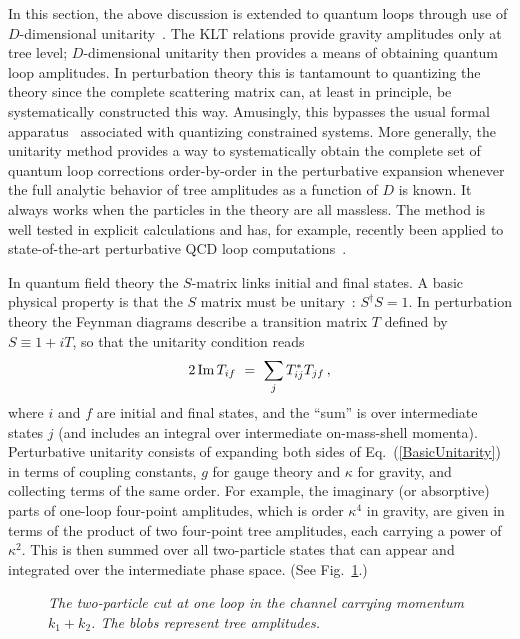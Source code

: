 \documentclass[12pt]{livrev}
\begin{document}
In this section, the above discussion is extended to quantum loops
through use of $D$-dimensional
unitarity~\cite{Bern94SusyFour,Bern95SusyFour,BernMorgan,Review,Rozowsky}.
The KLT relations provide gravity amplitudes only at tree level;
$D$-dimensional unitarity then provides a means of obtaining quantum
loop amplitudes. In perturbation theory this is tantamount to
quantizing the theory since the complete scattering matrix can, at least in
principle, be systematically constructed this way.  Amusingly, this
bypasses the usual formal
apparatus~\cite{Faddeev74,Fradkin75,Batalin77,Henneaux85} associated
with quantizing constrained systems.  More generally, the unitarity
method provides a way to systematically obtain the complete set of
quantum loop corrections order-by-order in the perturbative expansion
whenever the full analytic behavior of tree amplitudes as a function
of $D$ is known.  It always works when the particles in the theory are
all massless.  The method is well tested in explicit calculations and
has, for example, recently been applied to state-of-the-art perturbative QCD
loop computations~\cite{Bern00QCDApplications,Bern02QCDApplications}.

In quantum field theory the $S$-matrix links initial and final states.
A basic physical property is that the $S$ matrix must be
unitary~\cite{Mandelstam58,Landau59,Mandelstam59,Cutkosky60}: $S^\dag
S = 1$.  In perturbation theory the Feynman diagrams describe a
transition matrix $T$ defined by $S \equiv 1 + i T$, so that the
unitarity condition reads
%
\begin{equation}
 2 \, {\rm Im}\, T_{if}\ =\ \sum_j T^*_{ij} T_{jf} \, , 
\label{BasicUnitarity}
\end{equation}
%
where $i$ and $f$ are initial and final states, and the ``sum'' is over
intermediate states $j$ (and includes an integral over intermediate
on-mass-shell momenta).  Perturbative unitarity consists of expanding
both sides of Eq.~(\ref{BasicUnitarity}) in terms of coupling
constants, $g$ for gauge theory and $\kappa$ for gravity, and
collecting terms of the same order.  For example, the imaginary (or
absorptive) parts of one-loop four-point amplitudes, which is order
$\kappa^4$ in gravity, are given in terms of the product of two
four-point tree amplitudes, each carrying a power of $\kappa^2$.  This
is then summed over all two-particle states that can appear and
integrated over the intermediate phase space. (See
Fig.~\ref{figure:TwoParticle}.)


\begin{figure}[h]
  \def\epsfsize#1#2{0.9#1} \centerline{}
  \caption{\it The two-particle cut at one loop in the channel
  carrying momentum $k_1+k_2$. The blobs represent tree
  amplitudes.}  
\label{figure:TwoParticle}
\end{figure}
\end{document}
